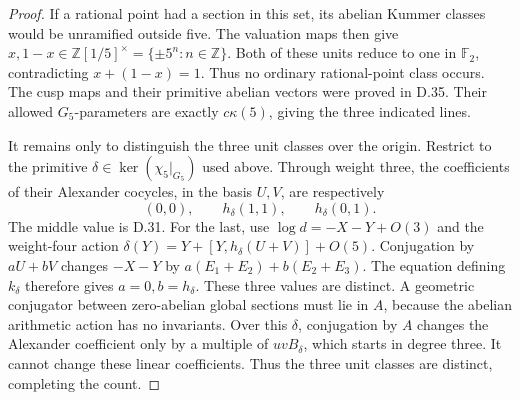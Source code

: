 \begin{proof}
If a rational point had a section
in this set, its abelian Kummer
classes would be unramified outside
five. The valuation maps then give
\(x,1-x\in\mathbb Z[1/5]^\times
=\{\pm5^n:n\in\mathbb Z\}\).
Both of these units reduce to one
in \(\mathbb F_2\), contradicting
\(x+(1-x)=1\). Thus no ordinary
rational-point class occurs.
The cusp maps and their primitive
abelian vectors were proved in
D.35. Their allowed \(G_5\)-parameters
are exactly \(c\kappa(5)\), giving
the three indicated lines.

It remains only to distinguish the
three unit classes over the origin.
Restrict to the primitive
\(\delta\in\ker(\chi_5|_{G_5})\)
used above. Through weight three,
the coefficients of their Alexander
cocycles, in the basis \(U,V\), are
respectively
\[
                   (0,0),\qquad
                   h_\delta(1,1),\qquad
                   h_\delta(0,1).
\]
The middle value is D.31.
For the last, use
\(\log d=-X-Y+O(3)\) and the
weight-four action
\(\delta(Y)=Y+[Y,h_\delta(U+V)]+O(5)\).
Conjugation by \(aU+bV\) changes
\(-X-Y\) by
\(a(E_1+E_2)+b(E_2+E_3)\).
The equation defining \(k_\delta\)
therefore gives \(a=0,b=h_\delta\).
These three values are distinct.
A geometric conjugator between
zero-abelian global sections must
lie in \(A\), because the abelian
arithmetic action has no invariants.
Over this \(\delta\), conjugation
by \(A\) changes the Alexander
coefficient only by a multiple
of \(uvB_\delta\), which starts
in degree three. It cannot change
these linear coefficients.
Thus the three unit classes are
distinct, completing the count.
\end{proof}

